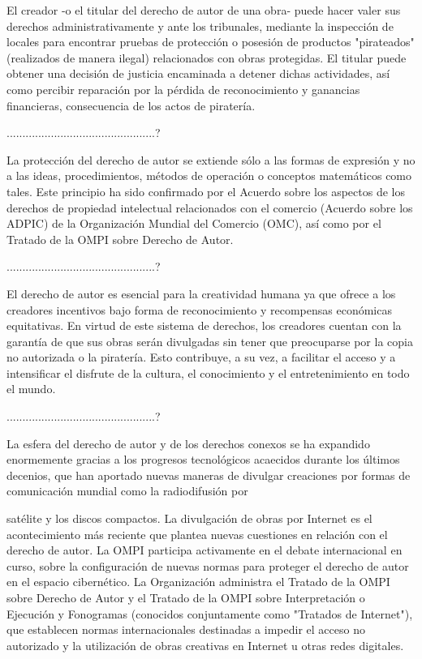 El creador -o el titular del derecho de autor de una obra- puede hacer valer sus derechos administrativamente y ante los tribunales, mediante la inspección de locales para encontrar pruebas de protección o posesión de productos "pirateados" (realizados de manera ilegal) relacionados con obras protegidas. El titular puede obtener una decisión de justicia encaminada a detener dichas actividades, así como percibir reparación por la pérdida de reconocimiento y ganancias financieras, consecuencia de los actos de piratería.

...............................................?

La protección del derecho de autor se extiende sólo a las formas de expresión y no a las ideas, procedimientos, métodos de operación o conceptos matemáticos como tales. Este principio ha sido confirmado por el Acuerdo sobre los aspectos de los derechos de propiedad intelectual relacionados con el comercio (Acuerdo sobre los ADPIC) de la Organización Mundial del Comercio (OMC), así como por el Tratado de la OMPI sobre Derecho de Autor.

...............................................?

El derecho de autor es esencial para la creatividad humana ya que ofrece a los creadores incentivos bajo forma de reconocimiento y recompensas económicas equitativas. En virtud de este sistema de derechos, los creadores cuentan con la garantía de que sus obras serán divulgadas sin tener que preocuparse por la copia no autorizada o la piratería. Esto contribuye, a su vez, a facilitar el acceso y a intensificar el disfrute de la cultura, el conocimiento y el entretenimiento en todo el mundo.

...............................................?

La esfera del derecho de autor y de los derechos conexos se ha expandido enormemente gracias a los progresos tecnológicos acaecidos durante los últimos decenios, que han aportado nuevas maneras de divulgar creaciones por formas de comunicación mundial como la radiodifusión por



satélite y los discos compactos. La divulgación de obras por Internet es el acontecimiento más reciente que plantea nuevas cuestiones en relación con el derecho de autor. La OMPI participa activamente en el debate internacional en curso, sobre la configuración de nuevas normas para proteger el derecho de autor en el espacio cibernético. La Organización administra el Tratado de la OMPI sobre Derecho de Autor y el Tratado de la OMPI sobre Interpretación o Ejecución y Fonogramas (conocidos conjuntamente como "Tratados de Internet"), que establecen normas internacionales destinadas a impedir el acceso no autorizado y la utilización de obras creativas en Internet u otras redes digitales.

